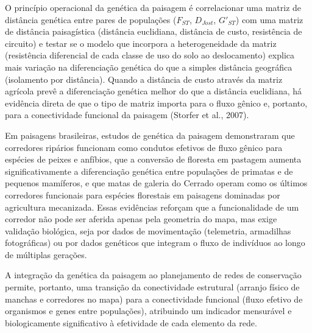 \documentclass[
  portuguese,
  11pt,
  a4paper,
  open=any]{scrbook}
\begin{document}
O princípio operacional da genética da paisagem é correlacionar uma
matriz de distância genética entre pares de populações (\(F_{ST}\),
\(D_{Jost}\), \(G'_{ST}\)) com uma matriz de distância paisagística
(distância euclidiana, distância de custo, resistência de circuito) e
testar se o modelo que incorpora a heterogeneidade da matriz
(resistência diferencial de cada classe de uso do solo ao deslocamento)
explica mais variação na diferenciação genética do que a simples
distância geográfica (isolamento por distância). Quando a distância de
custo através da matriz agrícola prevê a diferenciação genética melhor
do que a distância euclidiana, há evidência direta de que o tipo de
matriz importa para o fluxo gênico e, portanto, para a conectividade
funcional da paisagem (Storfer et al., 2007).

Em paisagens brasileiras, estudos de genética da paisagem demonstraram
que corredores ripários funcionam como condutos efetivos de fluxo gênico
para espécies de peixes e anfíbios, que a conversão de floresta em
pastagem aumenta significativamente a diferenciação genética entre
populações de primatas e de pequenos mamíferos, e que matas de galeria
do Cerrado operam como os últimos corredores funcionais para espécies
florestais em paisagens dominadas por agricultura mecanizada. Essas
evidências reforçam que a funcionalidade de um corredor não pode ser
aferida apenas pela geometria do mapa, mas exige validação biológica,
seja por dados de movimentação (telemetria, armadilhas fotográficas) ou
por dados genéticos que integram o fluxo de indivíduos ao longo de
múltiplas gerações.

A integração da genética da paisagem ao planejamento de redes de
conservação permite, portanto, uma transição da conectividade estrutural
(arranjo físico de manchas e corredores no mapa) para a conectividade
funcional (fluxo efetivo de organismos e genes entre populações),
atribuindo um indicador mensurável e biologicamente significativo à
efetividade de cada elemento da rede.
\end{document}
